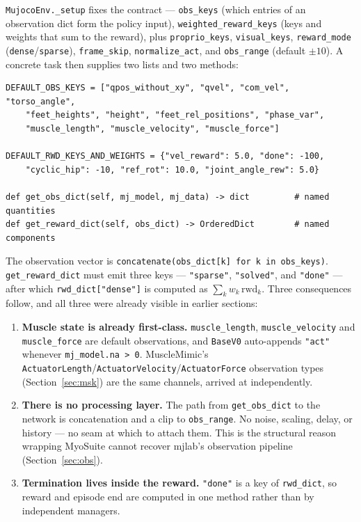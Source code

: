 \documentclass[11pt,a4paper]{article}
\begin{document}
\texttt{MujocoEnv.\_setup} fixes the contract --- \texttt{obs\_keys} (which entries of an
observation dict form the policy input), \texttt{weighted\_reward\_keys} (keys and weights
that sum to the reward), plus \texttt{proprio\_keys}, \texttt{visual\_keys},
\texttt{reward\_mode} (\texttt{dense}/\texttt{sparse}), \texttt{frame\_skip},
\texttt{normalize\_act}, and \texttt{obs\_range} (default $\pm 10$). A concrete task then
supplies two lists and two methods:

\begin{lstlisting}
DEFAULT_OBS_KEYS = ["qpos_without_xy", "qvel", "com_vel", "torso_angle",
    "feet_heights", "height", "feet_rel_positions", "phase_var",
    "muscle_length", "muscle_velocity", "muscle_force"]

DEFAULT_RWD_KEYS_AND_WEIGHTS = {"vel_reward": 5.0, "done": -100,
    "cyclic_hip": -10, "ref_rot": 10.0, "joint_angle_rew": 5.0}

def get_obs_dict(self, mj_model, mj_data) -> dict         # named quantities
def get_reward_dict(self, obs_dict) -> OrderedDict        # named components
\end{lstlisting}

\noindent
The observation vector is \texttt{concatenate(obs\_dict[k] for k in obs\_keys)}.
\texttt{get\_reward\_dict} must emit three keys --- \texttt{"sparse"}, \texttt{"solved"},
and \texttt{"done"} --- after which \texttt{rwd\_dict["dense"]} is computed as
$\sum_k w_k\,\mathrm{rwd}_k$. Three consequences follow, and all three were already visible
in earlier sections:

\begin{enumerate}[leftmargin=1.4em,itemsep=0.25em]
\item \textbf{Muscle state is already first-class.} \texttt{muscle\_length},
\texttt{muscle\_velocity} and \texttt{muscle\_force} are default observations, and
\texttt{BaseV0} auto-appends \texttt{"act"} whenever \texttt{mj\_model.na > 0}. MuscleMimic's
\texttt{ActuatorLength}/\texttt{ActuatorVelocity}/\texttt{ActuatorForce} observation types
(Section~\ref{sec:msk}) are the same channels, arrived at independently.
\item \textbf{There is no processing layer.} The path from \texttt{get\_obs\_dict} to the
network is concatenation and a clip to \texttt{obs\_range}. No noise, scaling, delay, or
history --- no seam at which to attach them. This is the structural reason wrapping MyoSuite
cannot recover mjlab's observation pipeline (Section~\ref{sec:obs}).
\item \textbf{Termination lives inside the reward.} \texttt{"done"} is a key of
\texttt{rwd\_dict}, so reward and episode end are computed in one method rather than by
independent managers.
\end{enumerate}
\end{document}
